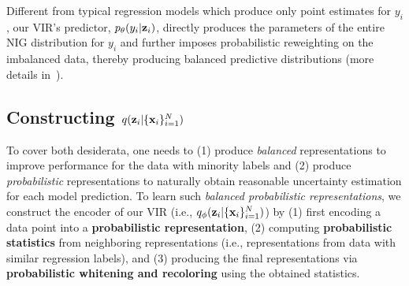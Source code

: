 Different from typical regression models which produce only point estimates for $y_i$, our VIR's predictor, $p_{\theta}(y_i|{\bf z}_i)$, directly produces the parameters of the entire NIG distribution for $y_i$ and further imposes probabilistic reweighting on the imbalanced data, thereby producing balanced predictive distributions (more details in~). 



\subsection{Constructing \texorpdfstring{$q({\bf z}_i|\{{\bf x}_i\}_{i=1}^N)$}{q(zi|{xi}{i=1}{N})}} \label{sec:PRM}

To cover both desiderata, one needs to (1) produce \emph{balanced} representations to improve performance for the data with minority labels and (2) produce \emph{probabilistic} representations to naturally obtain reasonable uncertainty estimation for each model prediction. To learn such \emph{balanced probabilistic representations}, {we construct the encoder of our VIR (i.e., $q_{\phi}({\bf z}_i|\{{\bf x}_i\}^{N}_{i=1})$) by (1) first encoding a data point into a \textbf{probabilistic representation}, (2) computing \textbf{probabilistic statistics} from neighboring representations (i.e., representations from data with similar regression labels), and (3) producing the final representations via \textbf{probabilistic whitening and recoloring} using the obtained statistics.} 

